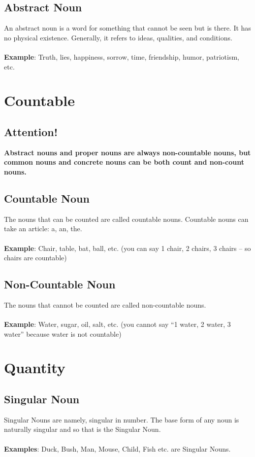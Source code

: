 \subsection{Abstract Noun}
An abstract noun is a word for something that cannot be seen but is there. It has no physical existence. Generally, it refers to ideas, qualities, and conditions.\\\\
\textbf{Example}: Truth, lies, happiness, sorrow, time, friendship, humor, patriotism, etc.

\newpage
\section{Countable}
\subsection{Attention!}
\textbf{Abstract nouns and proper nouns are always non-countable nouns, but common nouns and concrete nouns can be both count and non-count nouns.}
\subsection{Countable Noun}
The nouns that can be counted are called countable nouns. Countable nouns can take an article: a, an, the.\\\\
\textbf{Example}: Chair, table, bat, ball, etc. (you can say 1 chair, 2 chairs, 3 chairs – so chairs are countable)

\subsection{Non-Countable Noun}
The nouns that cannot be counted are called non-countable nouns.\\\\
\textbf{Example}: Water, sugar, oil, salt, etc. (you cannot say “1 water, 2 water, 3 water” because water is not countable)

\newpage
\section{Quantity}
\subsection{Singular Noun}
Singular Nouns are namely, singular in number. The base form of any noun is naturally singular and so that is the Singular Noun.\\\\
\textbf{Examples}: Duck, Bush, Man, Mouse, Child, Fish etc. are Singular Nouns.

